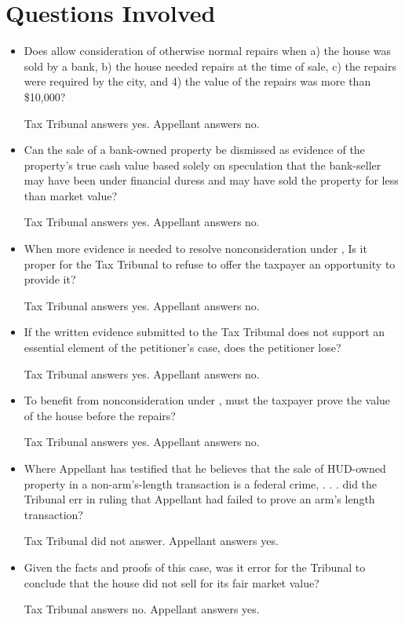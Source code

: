 \section{Questions Involved}
\begin{itemize}

\item Does  allow consideration of otherwise normal repairs when a) the house was sold by a bank, b) the house needed repairs at the time of sale, c) the repairs were required by the city, and 4) the value of the repairs was more than \$10,000?

Tax Tribunal answers yes. Appellant answers no.

\item Can the sale of a bank-owned property be dismissed as evidence of the property's true cash value based solely on speculation that the bank-seller may have been under financial duress and may have sold the property for less than market value? 

 Tax Tribunal answers yes. Appellant answers no.

\item  When more evidence is needed to resolve nonconsideration under , Is it proper for the Tax Tribunal to refuse to offer the taxpayer an opportunity to provide it?

 Tax Tribunal answers yes. Appellant answers no.

\item If the written evidence submitted to the Tax Tribunal does not support an essential element of the petitioner's case, does the petitioner lose?

 Tax Tribunal answers yes. Appellant answers no.

\item To benefit from nonconsideration under , must the taxpayer prove the value of the house before the repairs?

 Tax Tribunal answers yes. Appellant answers no.

\item  Where Appellant has testified that he believes that the sale of HUD-owned property in a non-arm's-length transaction is a federal crime, . . . did the Tribunal err in ruling that Appellant had failed to prove an arm's length transaction?

 Tax Tribunal did not answer. Appellant answers yes.

\item Given the facts and proofs of this case, was it error for the Tribunal to conclude that the house did not sell for its fair market value?

 Tax Tribunal answers no. Appellant answers yes.

\end{itemize}

